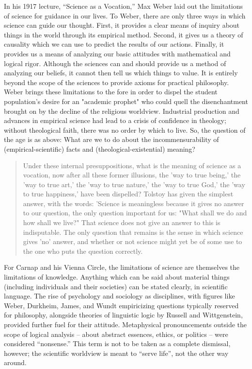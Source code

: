 \documentclass[leqno, 12pt]{turabian-researchpaper}
\begin{document}
	In his 1917 lecture, \enquote{Science as a Vocation,} Max Weber laid out the limitations
	of science for guidance in our lives. To Weber, there are only three ways in which
	science can guide our thought. First, it provides a clear means of inquiry about
	things in the world through its empirical method. Second, it gives us a theory
	of causality which we can use to predict the results of our actions. Finally, it
	provides us a means of analyzing our basic attitudes with mathematical and logical
	rigor. Although the sciences can and should provide us a method of analyzing
	our beliefs, it cannot then tell us which things to value. It is entirely
	beyond the scope of the sciences to provide axioms for practical philosophy. Weber
	brings these limitations to the fore in order to dispel the student population's
	desire for an "academic prophet" who could quell the disenchantment brought on
	by the decline of the religious worldview. Industrial production and advances
	in empirical science had lead to a crisis of confidence in theology; without theological
	faith, there was no order by which to live. So, the question of the age is as
	above: What are we to do about the incommensurability of (empirical-scientific)
	facts and (theological-existential) meaning?

	\blockquote[{\cite[139]{weber2014}}]{Under these internal presuppositions, what is the meaning of science as a vocation, now after all these former illusions, the 'way to true being,' the 'way to true art,' the 'way to true nature,' the 'way to true God,' the 'way to true happiness,' have been dispelled? Tolstoy has given the simplest answer, with the words: 'Science is meaningless because it gives no answer to our question, the only question important for us: "What shall we do and how shall we live?" That science does not give an answer to this is indisputable. The only question that remains is the sense in which science gives 'no' answer, and whether or not science might yet be of some use to the one who puts the question correctly.}

	For Carnap and his Vienna Circle, the limitations of science are themselves the
	limitations of knowledge. Anything which can be said about material things (including
	individuals and their societies) can be stated clearly, in scientific language.
	The rise of psychology and sociology as disciplines, with figures like Weber,
	Durkheim, James, and Wundt empiricizing questions typically reserved for
	philosophy, alongside theories of linguistic logic by Russell and Wittgenstein,
	provided further fuel for their attitude. Metaphysical pronouncements outside the
	scope of logical analysis -- about abstract essences, ethics, or politics -- were
	considered \enquote{nonsense.} This term is not to be taken as a complete
	dismissal, however; the scientific worldview is meant to \enquote{serve life},
	not the other way around.
\end{document}
